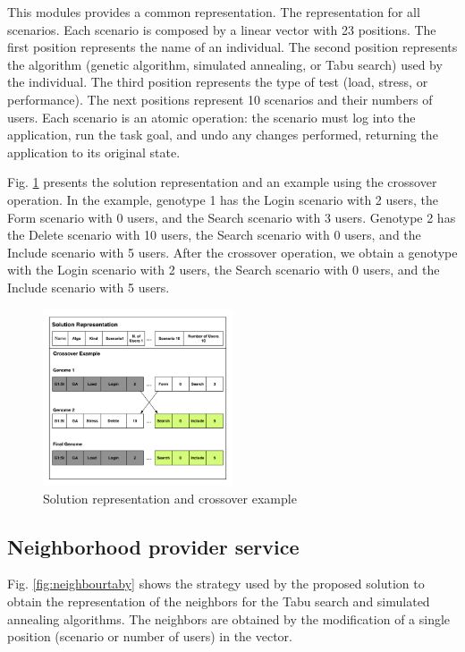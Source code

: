 This modules provides a common representation. The representation for all scenarios. Each scenario is composed by a linear vector with 23 positions. The first position represents the name of an individual. The second position represents the algorithm (genetic algorithm, simulated annealing, or Tabu search) used by the individual. The third position represents the type of test (load, stress, or performance). The next positions represent 10 scenarios and their numbers of users. Each scenario is an atomic operation: the scenario must log into the application, run the task goal, and undo any changes performed, returning the application to its original state.

Fig. \ref{fig:genomarepresentation} presents the solution representation and an example using the crossover operation. In the example, genotype 1 has the Login scenario with 2 users, the Form scenario with 0 users, and the Search scenario with 3 users. Genotype 2 has the Delete scenario with 10 users, the Search scenario with 0 users, and the Include scenario with 5 users. After the crossover operation, we obtain a genotype with the Login scenario with 2 users, the Search scenario with 0 users, and the Include scenario with 5 users.

\begin{figure}[h]
\centering
\includegraphics[width=0.5\textwidth]{./images/genomerepresentation1.png}
\caption{Solution representation and crossover example}
\label{fig:genomarepresentation}
\end{figure}


\subsection{Neighborhood provider service}


Fig. \ref{fig:neighbourtaby} shows the strategy used by the proposed solution to obtain the representation of the neighbors for the Tabu search and simulated annealing algorithms. The neighbors are obtained by the modification of a single position (scenario or number of users) in the vector.


